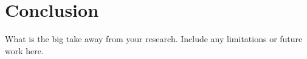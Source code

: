 \section{Conclusion}
\label{sec:conclusion}
What is the big take away from your research. Include any limitations or future work here. 






